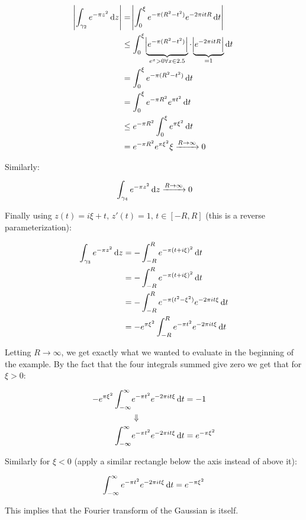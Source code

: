 \begin{example}
\begin{align*}
    \abs{\int_{\gamma_2} e^{-\pi z^2} \dif z} &= \abs{\int_{0}^\xi e^{-\pi (R^2-t^2)} e^{-2 \pi i t R}  \dif t}\\
    & \leq \int_{0}^\xi \underbrace{\abs{ e^{-\pi (R^2-t^2)} }}_{e^x > 0 \forall x \in \R} \cdot \underbrace{ \abs{e^{-2 \pi i t R} }}_{=1} \dif t\\
    &= \int_{0}^\xi e^{-\pi (R^2-t^2)}  \dif t \\ &= \int_{0}^\xi e^{-\pi R^2} e^{\pi t^2}  \dif t \\ 
    & \leq e^{-\pi R^2}  \int_{0}^\xi e^{\pi \xi^2} \dif t \\ &= e^{-\pi R^2} e^{\pi \xi^2} \xi \xrightarrow{R\to \infty} 0\\
\end{align*}

Similarly:

\begin{align*}
    &\int_{\gamma_4} e^{-\pi z^2} \dif z \xrightarrow{R\to \infty} 0\\
\end{align*}

Finally using $z(t) = i\xi +t, \, z'(t) = 1,  \, t \in [-R,R]$ (this is a reverse parameterization):

\begin{align*}
    \int_{\gamma_3} e^{-\pi z^2} \dif z &= - \int_{-R}^R e^{-\pi (t+i\xi)^2}  \dif t\\
    &= - \int_{-R}^R e^{-\pi (t+i\xi)^2}  \dif t\\
    & = - \int_{-R}^R e^{-\pi (t^2-\xi^2)} e^{-2\pi i t \xi}  \dif t\\
    &= - e^{\pi \xi ^2 } \int_{-R}^R e^{-\pi t^2} e^{-2\pi i t \xi}  \dif t
\end{align*}

Letting $R \to \infty$, we get exactly what we wanted to evaluate in the beginning of the example. By the fact that the four integrals summed give zero we get that for $ \xi > 0$:

\begin{align*}
    - e^{\pi \xi ^2 } \int_{-\infty}^\infty &e^{-\pi t^2} e^{-2\pi i t \xi}  \dif t = -1\\
    &\Downarrow\\
    \int_{-\infty}^\infty &e^{-\pi t^2} e^{-2\pi i t \xi}  \dif t = e^{-\pi \xi ^2 }
\end{align*}

Similarly for $\xi < 0$ (apply a similar rectangle below the axis instead of above it):

\begin{align*}
    \int_{-\infty}^\infty e^{-\pi t^2} e^{-2\pi i t \xi}  \dif t = e^{-\pi \xi ^2 }
\end{align*}

This implies that the Fourier transform of the Gaussian is itself.

\end{example}
